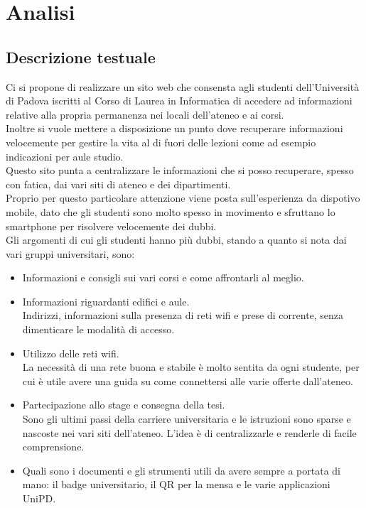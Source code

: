 \section{Analisi}
\subsection{Descrizione testuale}

Ci si propone di realizzare un sito web che consensta agli studenti dell'Università di Padova iscritti al Corso di Laurea in Informatica di accedere ad informazioni relative alla propria permanenza nei locali dell'ateneo e ai corsi.\\
Inoltre si vuole mettere a disposizione un punto dove recuperare informazioni velocemente per gestire la vita al di fuori delle lezioni come ad esempio indicazioni per aule studio.\\
Questo sito punta a centralizzare le informazioni che si posso recuperare, spesso con fatica, dai vari siti di ateneo e dei dipartimenti.\\
Proprio per questo particolare attenzione viene posta sull'esperienza da dispotivo mobile, dato che gli studenti sono molto spesso in movimento e sfruttano lo smartphone per risolvere velocemente dei dubbi.\\
Gli argomenti di cui gli studenti hanno più dubbi, stando a quanto si nota dai vari gruppi universitari, sono:
\begin{itemize}
    \item Informazioni e consigli sui vari corsi e come affrontarli al meglio.
    \item Informazioni riguardanti edifici e aule.\\ Indirizzi, informazioni sulla presenza di reti wifi e prese di corrente, senza dimenticare le modalità di accesso.
    \item Utilizzo delle reti wifi. \\ La necessità di una rete buona e stabile è molto sentita da ogni studente, per cui è utile avere una guida su come connettersi alle varie offerte dall'ateneo.   
    \item Partecipazione allo stage e consegna della tesi. \\ Sono gli ultimi passi della carriere universitaria e le istruzioni sono sparse e nascoste nei vari siti dell'ateneo. L'idea è di centralizzarle e renderle di facile comprensione.
    \item Quali sono i documenti e gli strumenti utili da avere sempre a portata di mano: il badge universitario, il QR per la mensa e le varie applicazioni UniPD.
\end{itemize}

